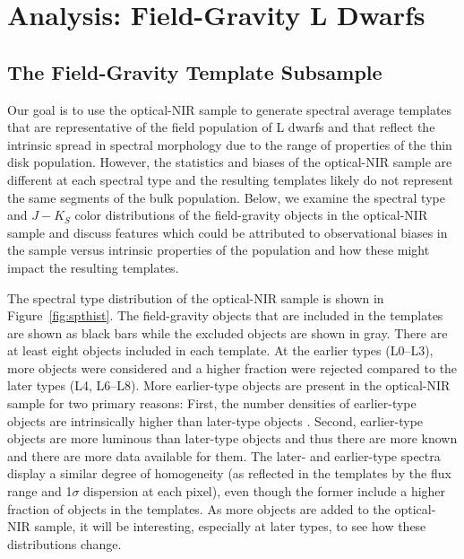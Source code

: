 \documentclass[modern]{aastex61}
\begin{document}
\clearpage



\section{Analysis: Field-Gravity L Dwarfs}
\label{sec:fieldg}

\subsection{The Field-Gravity Template Subsample}
\label{sec:templates_normal}

Our goal is to use the optical-NIR sample to generate spectral average templates that are representative of the field population of L dwarfs and that reflect the intrinsic spread in spectral morphology due to the range of properties of the thin disk population.
However, the statistics and biases of the optical-NIR sample are different at each spectral type and the resulting templates likely do not represent the same segments of the bulk population.
Below, we examine the spectral type and $J-K_S$ color distributions of the field-gravity objects in the optical-NIR sample and discuss features which could be attributed to observational biases in the sample versus intrinsic properties of the population and how these might impact the resulting templates.

The spectral type distribution of the optical-NIR sample is shown in Figure~\ref{fig:spthist}.
The field-gravity objects that are included in the templates are shown as black bars while the excluded objects are shown in gray.
There are at least eight objects included in each template.
At the earlier types (L0--L3), more objects were considered and a higher fraction were rejected compared to the later types (L4, L6--L8).
More earlier-type objects are present in the optical-NIR sample for two primary reasons: First, the number densities of earlier-type objects are intrinsically higher than later-type objects \citep{Cruz03,Reid08,DayJones:2013hm}.
Second, earlier-type objects are more luminous than later-type objects and thus there are more known and there are more data available for them.
The later- and earlier-type spectra display a similar degree of homogeneity (as reflected in the templates by the flux range and 1$\sigma$ dispersion at each pixel), even though the former include a higher fraction of objects in the templates.
As more objects are added to the optical-NIR sample, it will be interesting, especially at later types, to see how these distributions change.
\end{document}
